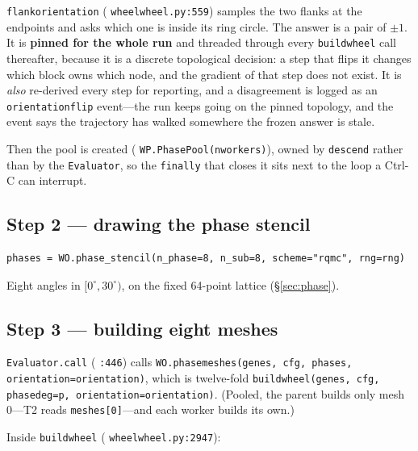 \documentclass[11pt,a4paper]{article}
\DeclareRobustCommand{\code}[1]{%
  \texttt{\small\def\_{\textunderscore\discretionary{}{}{}}#1}}
\newcommand{\at}[2]{\code{#1:#2}}
\begin{document}
\code{flank\_orientation} (\at{wheel\_wheel.py}{559}) samples the two flanks at the
endpoints and asks which one is inside its ring circle. The answer is a pair of $\pm1$.
It is \textbf{pinned for the whole run} and threaded through every \code{build\_wheel}
call thereafter, because it is a discrete topological decision: a step that flips it
changes which block owns which node, and the gradient of that step does not exist. It is
\emph{also} re-derived every step for reporting, and a disagreement is logged as an
\code{orientation\_flip} event---the run keeps going on the pinned topology, and the
event says the trajectory has walked somewhere the frozen answer is stale.

Then the pool is created (\code{WP.PhasePool(n\_workers)}), owned by \code{descend}
rather than by the \code{Evaluator}, so the \code{finally} that closes it sits next to
the loop a Ctrl-C can interrupt.

\subsection*{Step 2 --- drawing the phase stencil}

\begin{lstlisting}[style=py]
phases = WO.phase_stencil(n_phase=8, n_sub=8, scheme="rqmc", rng=rng)
\end{lstlisting}

Eight angles in $[0^\circ, 30^\circ)$, on the fixed 64-point lattice
(\S\ref{sec:phase}).

\subsection*{Step 3 --- building eight meshes}

\code{Evaluator.\_\_call\_\_} (\code{:446}) calls
\code{WO.phase\_meshes(genes, cfg, phases, orientation=orientation)}, which is
twelve-fold \code{build\_wheel(genes, cfg, phase\_deg=p, orientation=orientation)}.
(Pooled, the parent builds only mesh 0---T2 reads \code{meshes[0]}---and each worker
builds its own.)

Inside \code{build\_wheel} (\at{wheel\_wheel.py}{2947}):
\end{document}
